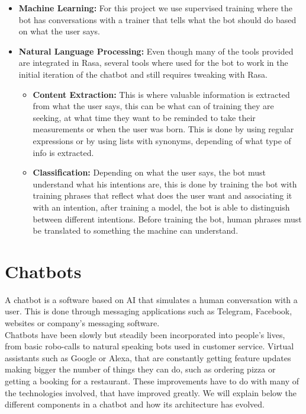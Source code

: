 \begin{itemize}
	\item {\textbf{Machine Learning:} For this project we use supervised training where the bot has conversations with a trainer that tells what the bot should do based on what the user says.}
	\item {\textbf{Natural Language Processing:} Even though many of the tools provided are integrated in Rasa, several tools where used for the bot to work in the initial iteration of the chatbot and still requires tweaking with Rasa.\\
		
		\begin{itemize}
			\item {\textbf{Content Extraction:} This is where valuable information is extracted from what the user says, this can be what can of training they are seeking, at what time they want to be reminded to take their measurements or when the user was born. This is done by using regular expressions or by using lists with synonyms, depending of what type of info is extracted.}
			\item {\textbf{Classification:} Depending on what the user says, the bot must understand what his intentions are, this is done by training the bot with training phrases that reflect what does the user want and associating it with an intention, after training a model, the bot is able to distinguish between different intentions. Before training the bot, human phrases must be translated to something the machine can understand.}
		\end{itemize}
			}
\end{itemize}

\section{Chatbots}\label{sec:chap3_ai}
A chatbot is a software based on AI that simulates a human conversation with a user. This is done through messaging applications such as Telegram, Facebook, websites or company’s messaging software.\\

Chatbots have been slowly but steadily been incorporated into people’s lives, from basic robo-calls to natural speaking bots used in customer service. Virtual assistants such as Google or Alexa, that are constantly getting feature updates making bigger the number of things they can do, such as ordering pizza or getting a booking for a restaurant. These improvements have to do with many of the technologies involved, that have improved greatly. We will explain below the different components in a chatbot and how its architecture has evolved.\\

